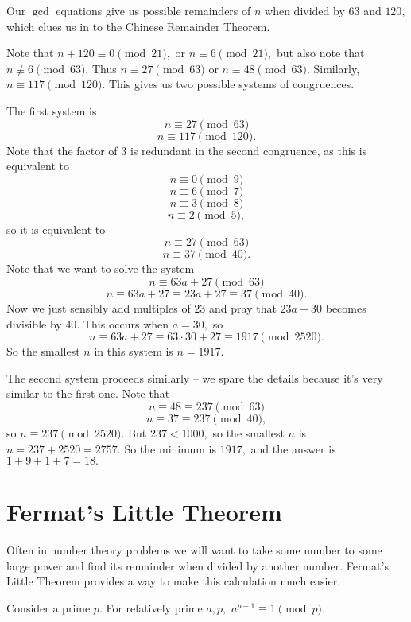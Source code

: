 \documentclass[mast]{lucky}
\begin{document}
\begin{sol}
Our $\gcd$ equations give us possible remainders of $n$ when divided by $63$ and $120,$ which clues us in to the Chinese Remainder Theorem.

Note that $n+120\equiv 0\pmod{21},$ or $n\equiv 6\pmod{21},$ but also note that $n\not\equiv 6\pmod{63}.$ Thus $n\equiv 27\pmod{63}$ or $n\equiv 48\pmod{63}.$ Similarly, $n\equiv 117\pmod{120}.$ This gives us two possible systems of congruences.

The first system is
\[n\equiv 27\pmod{63}\]
\[n\equiv 117\pmod{120}.\]
Note that the factor of $3$ is redundant in the second congruence, as this is equivalent to
\[n\equiv 0\pmod{9}\]
\[n\equiv 6\pmod{7}\]
\[n\equiv 3\pmod{8}\]
\[n\equiv 2\pmod{5},\]
so it is equivalent to
\[n\equiv 27\pmod{63}\]
\[n\equiv 37\pmod{40}.\]
Note that we want to solve the system
\[n\equiv 63a+27\pmod{63}\]
\[n\equiv 63a+27\equiv 23a+27\equiv 37\pmod{40}.\]
Now we just sensibly add multiples of $23$ and pray that $23a+30$ becomes divisible by $40.$ This occurs when $a=30,$ so
\[n\equiv 63a+27\equiv 63\cdot 30+27\equiv 1917\pmod{2520}.\]
So the smallest $n$ in this system is $n=1917.$

The second system proceeds similarly -- we spare the details because it's very similar to the first one. Note that
\[n\equiv 48\equiv 237\pmod{63}\]
\[n\equiv 37\equiv 237\pmod{40},\]
so $n\equiv 237\pmod{2520}.$
But $237<1000,$ so the smallest $n$ is $n=237+2520=2757.$ So the minimum is $1917,$ and the answer is $1+9+1+7=18.$
\end{sol}

\section{Fermat's Little Theorem}

Often in number theory problems we will want to take some number to some large power and find its remainder when divided by another number. Fermat's Little Theorem provides a way to make this calculation much easier.

\begin{theo}
Consider a prime $p.$ For relatively prime $a,p,$ $a^{p-1}\equiv 1\pmod {p}.$
\end{theo}
\end{document}
